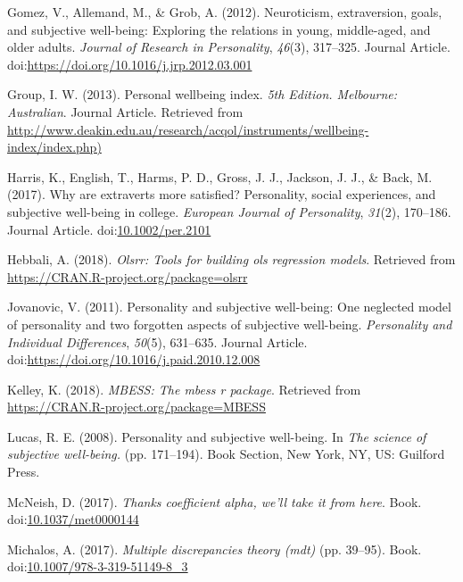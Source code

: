 \documentclass[man,floatsintext]{apa6}
\theoremstyle{definition}
\theoremstyle{definition}
\theoremstyle{definition}
\theoremstyle{remark}
\begin{document}
\hypertarget{ref-RN534}{}
Gomez, V., Allemand, M., \& Grob, A. (2012). Neuroticism, extraversion,
goals, and subjective well-being: Exploring the relations in young,
middle-aged, and older adults. \emph{Journal of Research in
Personality}, \emph{46}(3), 317--325. Journal Article.
doi:\href{https://doi.org/https://doi.org/10.1016/j.jrp.2012.03.001}{https://doi.org/10.1016/j.jrp.2012.03.001}

\hypertarget{ref-RN567}{}
Group, I. W. (2013). Personal wellbeing index. \emph{5th Edition.
Melbourne: Australian}. Journal Article. Retrieved from
\url{http://www.deakin.edu.au/research/acqol/instruments/wellbeing-index/index.php)}

\hypertarget{ref-RN558}{}
Harris, K., English, T., Harms, P. D., Gross, J. J., Jackson, J. J., \&
Back, M. (2017). Why are extraverts more satisfied? Personality, social
experiences, and subjective well-being in college. \emph{European
Journal of Personality}, \emph{31}(2), 170--186. Journal Article.
doi:\href{https://doi.org/10.1002/per.2101}{10.1002/per.2101}

\hypertarget{ref-R-olsrr}{}
Hebbali, A. (2018). \emph{Olsrr: Tools for building ols regression
models}. Retrieved from \url{https://CRAN.R-project.org/package=olsrr}

\hypertarget{ref-RN426}{}
Jovanovic, V. (2011). Personality and subjective well-being: One
neglected model of personality and two forgotten aspects of subjective
well-being. \emph{Personality and Individual Differences}, \emph{50}(5),
631--635. Journal Article.
doi:\href{https://doi.org/https://doi.org/10.1016/j.paid.2010.12.008}{https://doi.org/10.1016/j.paid.2010.12.008}

\hypertarget{ref-R-MBESS}{}
Kelley, K. (2018). \emph{MBESS: The mbess r package}. Retrieved from
\url{https://CRAN.R-project.org/package=MBESS}

\hypertarget{ref-RN549}{}
Lucas, R. E. (2008). Personality and subjective well-being. In \emph{The
science of subjective well-being.} (pp. 171--194). Book Section, New
York, NY, US: Guilford Press.

\hypertarget{ref-RN532}{}
McNeish, D. (2017). \emph{Thanks coefficient alpha, we'll take it from
here}. Book.
doi:\href{https://doi.org/10.1037/met0000144}{10.1037/met0000144}

\hypertarget{ref-RN300}{}
Michalos, A. (2017). \emph{Multiple discrepancies theory (mdt)} (pp.
39--95). Book.
doi:\href{https://doi.org/10.1007/978-3-319-51149-8_3}{10.1007/978-3-319-51149-8\_3}
\end{document}

